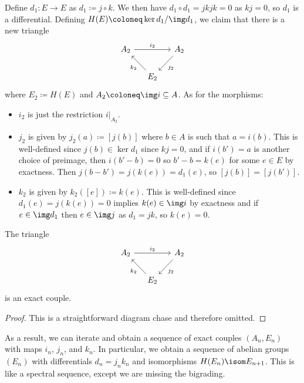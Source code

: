 \documentclass[wip, topology]{bsteffan-lecturenotes}
\begin{document}
Define $d_1\colon E \to E$ as $d_1 \coloneq j \circ k$.
We then have $d_1 \circ d_1 = jkjk = 0$ as $kj = 0$, so $d_1$ is a differential.
Defining $H(E) \coloneq \ker d_1 / \img d_1$, we claim that there is a new triangle
\begin{equation*}
	\begin{tikzcd}[column sep = small]
		A_2
				\ar[rr, "i_2"]
			& & A_2
				\ar[dl, "j_2"]
		\\
			& E_2
				\ar[ul, "k_2"]
	\end{tikzcd}
\end{equation*}
where $E_2 \coloneq H(E)$ and $A_2 \coloneq \img i \subseteq A$.
As for the morphisms:
\begin{itemize}
	\item $i_2$ is just the restriction $i|_{A_2}$.
	\item $j_2$ is given by $j_2(a) \coloneq [j(b)]$ where $b \in A$ is such that $a = i(b)$.
		This is well-defined since $j(b) \in \ker d_1$ since $kj = 0$, and if $i(b') = a$ is another choice of preimage, then $i(b' - b) = 0$ so $b' - b = k(e)$ for some $e \in E$ by exactness.
		Then $j(b - b') = j(k(e)) = d_1(e)$, so $[j(b)] = [j(b')]$.
	\item $k_2$ is given by $k_2([e]) \coloneq k(e)$.
		This is well-defined since $d_1(e) = j(k(e)) = 0$ implies $k(e) \in \img i$ by exactness and if $e \in \img d_1$ then $e \in \img j$ as $d_1 = jk$, so $k(e) = 0$.
\end{itemize}
\begin{lemma}
	The triangle
	\begin{equation*}
		\begin{tikzcd}[column sep = small]
			A_2
					\ar[rr, "i_2"]
				& & A_2
					\ar[dl, "j_2"]
			\\
				& E_2
					\ar[ul, "k_2"]
		\end{tikzcd}
	\end{equation*}
	is an exact couple.
\end{lemma}
\begin{proof}
	This is a straightforward diagram chase and therefore omitted.
\end{proof}
As a result, we can iterate and obtain a sequence of exact couples $(A_n, E_n)$ with maps $i_n$, $j_n$, and $k_n$.
In particular, we obtain a sequence of abelian groups $(E_n)$ with differentials $d_n = j_n k_n$ and isomorphisms $H(E_n) \isom E_{n + 1}$.
This is like a spectral sequence, except we are missing the bigrading.
\end{document}
